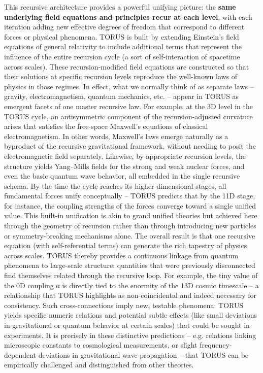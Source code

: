 \documentclass[]{article}
\begin{document}
This recursive architecture provides a powerful unifying picture: the
\textbf{same underlying field equations and principles recur at each
level}, with each iteration adding new effective degrees of freedom that
correspond to different forces or physical phenomena. TORUS is built by
extending Einstein's field equations of general relativity to include
additional terms that represent the influence of the entire recursion
cycle (a sort of self-interaction of spacetime across scales). These
recursion-modified field equations are constructed so that their
solutions at specific recursion levels reproduce the well-known laws of
physics in those regimes. In effect, what we normally think of as
separate laws -- gravity, electromagnetism, quantum mechanics, etc. --
appear in TORUS as emergent facets of one master recursive law. For
example, at the 3D level in the TORUS cycle, an antisymmetric component
of the recursion-adjusted curvature arises that satisfies the free-space
Maxwell's equations of classical electromagnetism. In other words,
Maxwell's laws emerge naturally as a byproduct of the recursive
gravitational framework, without needing to posit the electromagnetic
field separately. Likewise, by appropriate recursion levels, the
structure yields Yang--Mills fields for the strong and weak nuclear
forces, and even the basic quantum wave behavior, all embedded in the
single recursive schema. By the time the cycle reaches its
higher-dimensional stages, all fundamental forces unify conceptually --
TORUS predicts that by the 11D stage, for instance, the coupling
strengths of the forces converge toward a single unified value. This
built-in unification is akin to grand unified theories but achieved here
through the geometry of recursion rather than through introducing new
particles or symmetry-breaking mechanisms alone. The overall result is
that one recursive equation (with self-referential terms) can generate
the rich tapestry of physics across scales. TORUS thereby provides a
continuous linkage from quantum phenomena to large-scale structure:
quantities that were previously disconnected find themselves related
through the recursive loop. For example, the tiny value of the 0D
coupling α is directly tied to the enormity of the 13D cosmic timescale
-- a relationship that TORUS highlights as non-coincidental and indeed
necessary for consistency. Such cross-connections imply new, testable
phenomena: TORUS yields specific numeric relations and potential subtle
effects (like small deviations in gravitational or quantum behavior at
certain scales) that could be sought in experiments. It is precisely in
these distinctive predictions -- e.g. relations linking microscopic
constants to cosmological measurements, or slight frequency-dependent
deviations in gravitational wave propagation -- that TORUS can be
empirically challenged and distinguished from other theories.
\end{document}
